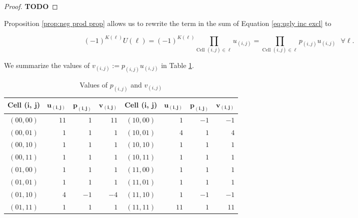 \documentclass[12pt]{article}
\theoremstyle{plain}
\theoremstyle{definition}
\theoremstyle{remark}
\theoremstyle{definition}
\begin{document}
\begin{proof}
    \textbf{TODO}
\end{proof}

Proposition \ref{prop:neg prod prop} allows us to rewrite the term in the sum of Equation \ref{eq:ugly inc excl} to

\begin{equation}
    (-1)^{K(\ell)}U(\ell) = (-1)^{K(\ell)} \prod_{\text{Cell }(i,j) \in \ell} u_{(i,j)} = \prod_{\text{Cell }(i,j) \in \ell} p_{(i,j)}u_{(i,j)} \text{ $\forall \ell$}.
    \label{eq:term fix}
\end{equation}

We summarize the values of $v_{(i,j)} := p_{(i,j)}u_{(i,j)}$ in Table \ref{tbl:values of p and v}.

\begin{table}[h!]
    \begin{center}
        \begin{tabular}{ |c|r|r|r|c|r|r|r| } 
            \hline
            \textbf{Cell (}$\mathbf{i}$\textbf{,} $\mathbf{j}$\textbf{)} & $\mathbf{u_{(i,j)}}$ & $\mathbf{p_{(i,j)}}$ & $\mathbf{v_{(i,j)}}$ & \textbf{Cell (}$\mathbf{i}$\textbf{,} $\mathbf{j}$\textbf{)} & $\mathbf{u_{(i,j)}}$ & $\mathbf{p_{(i,j)}}$ & $\mathbf{v_{(i,j)}}$ \\ 
            \hline
            $(00, 00)$ & $11$ & $1$ & $11$ & $(10, 00)$ & $1$ & $-1$ & $-1$ \\
            \hline
            $(00, 01)$ & $1$ & $1$ & $1$ & $(10, 01)$ & $4$ & $1$ & $4$ \\
            \hline
            $(00, 10)$ & $1$ & $1$ & $1$ & $(10, 10)$ & $1$ & $1$ & $1$ \\
            \hline
            $(00, 11)$ & $1$ & $1$ & $1$ & $(10, 11)$ & $1$ & $1$ & $1$ \\
            \hline
            $(01, 00)$ & $1$ & $1$ & $1$ & $(11, 00)$ & $1$ & $1$ & $1$ \\
            \hline
            $(01, 01)$ & $1$ & $1$ & $1$ & $(11, 01)$ & $1$ & $1$ & $1$ \\
            \hline
            $(01, 10)$ & $4$ & $-1$ & $-4$ & $(11, 10)$ & $1$ & $-1$ & $-1$ \\
            \hline
            $(01, 11)$ & $1$ & $1$ & $1$ & $(11, 11)$ & $11$ & $1$ & $11$ \\
            \hline
        \end{tabular}
        \caption{Values of $p_{(i,j)}$ and $v_{(i,j)}$}
        \label{tbl:values of p and v}
    \end{center}
\end{table}
\end{document}
